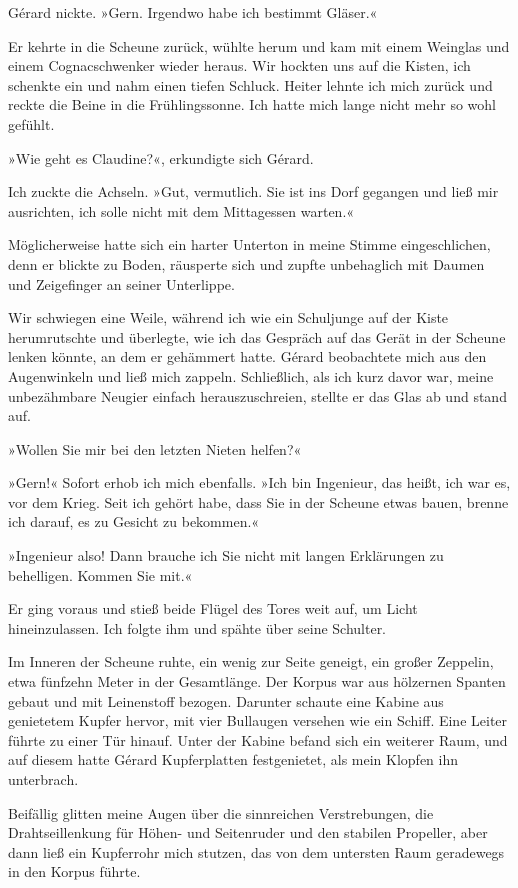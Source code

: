 Gérard nickte. »Gern. Irgendwo habe ich bestimmt Gläser.«

Er kehrte in die Scheune zurück, wühlte herum und kam mit einem
Weinglas und einem Cognacschwenker wieder heraus. Wir hockten uns
auf die Kisten, ich schenkte ein und nahm einen tiefen Schluck.
Heiter lehnte ich mich zurück und reckte die Beine in die
Frühlingssonne. Ich hatte mich lange nicht mehr so wohl gefühlt.

»Wie geht es Claudine?«, erkundigte sich Gérard.

Ich zuckte die Achseln. »Gut, vermutlich. Sie ist ins Dorf gegangen
und ließ mir ausrichten, ich solle nicht mit dem Mittagessen
warten.«

Möglicherweise hatte sich ein harter Unterton in meine Stimme
eingeschlichen, denn er blickte zu Boden, räusperte sich und zupfte
unbehaglich mit Daumen und Zeigefinger an seiner Unterlippe.

Wir schwiegen eine Weile, während ich wie ein Schuljunge auf der
Kiste herumrutschte und überlegte, wie ich das Gespräch auf das
Gerät in der Scheune lenken könnte, an dem er gehämmert hatte.
Gérard beobachtete mich aus den Augenwinkeln und ließ mich zappeln.
Schließlich, als ich kurz davor war, meine unbezähmbare Neugier
einfach herauszuschreien, stellte er das Glas ab und stand auf.

»Wollen Sie mir bei den letzten Nieten helfen?«

»Gern!« Sofort erhob ich mich ebenfalls. »Ich bin Ingenieur, das
heißt, ich war es, vor dem Krieg. Seit ich gehört habe, dass Sie in
der Scheune etwas bauen, brenne ich darauf, es zu Gesicht zu
bekommen.«

»Ingenieur also! Dann brauche ich Sie nicht mit langen Erklärungen
zu behelligen. Kommen Sie mit.«

Er ging voraus und stieß beide Flügel des Tores weit auf, um Licht
hineinzulassen. Ich folgte ihm und spähte über seine Schulter.

\bigpar

Im Inneren der Scheune ruhte, ein wenig zur Seite geneigt, ein
großer Zeppelin, etwa fünfzehn Meter in der Gesamtlänge. Der Korpus
war aus hölzernen Spanten gebaut und mit Leinenstoff bezogen.
Darunter schaute eine Kabine aus genietetem Kupfer hervor, mit vier
Bullaugen versehen wie ein Schiff. Eine Leiter führte zu einer Tür
hinauf. Unter der Kabine befand sich ein weiterer Raum, und auf
diesem hatte Gérard Kupferplatten festgenietet, als mein Klopfen
ihn unterbrach.

Beifällig glitten meine Augen über die sinnreichen Verstrebungen,
die Drahtseillenkung für Höhen- und Seitenruder und den stabilen
Propeller, aber dann ließ ein Kupferrohr mich stutzen, das von dem
untersten Raum geradewegs in den Korpus führte.

